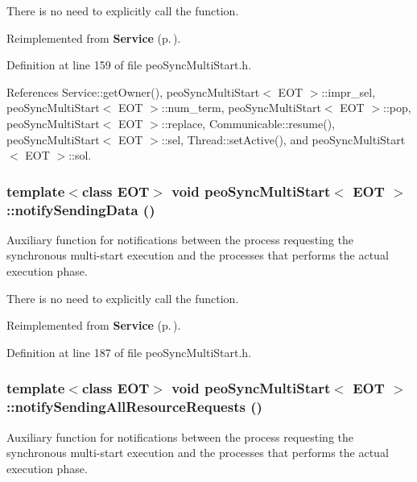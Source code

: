 There is no need to explicitly call the function. 

Reimplemented from {\bf Service} {\rm (p.\,\pageref{class_service_45c06344edbfa482b91f68e2035a6099})}.

Definition at line 159 of file peo\-Sync\-Multi\-Start.h.

References Service::get\-Owner(), peo\-Sync\-Multi\-Start$<$ EOT $>$::impr\_\-sel, peo\-Sync\-Multi\-Start$<$ EOT $>$::num\_\-term, peo\-Sync\-Multi\-Start$<$ EOT $>$::pop, peo\-Sync\-Multi\-Start$<$ EOT $>$::replace, Communicable::resume(), peo\-Sync\-Multi\-Start$<$ EOT $>$::sel, Thread::set\-Active(), and peo\-Sync\-Multi\-Start$<$ EOT $>$::sol.
\subsubsection{\setlength{\rightskip}{0pt plus 5cm}template$<$class EOT$>$ void {\bf peo\-Sync\-Multi\-Start}$<$ EOT $>$::notify\-Sending\-Data ()\hspace{0.3cm}{\tt  [virtual]}}\label{classpeo_sync_multi_start_32ec0d01d3fd8a9932abd68f4781fc94}


Auxiliary function for notifications between the process requesting the synchronous multi-start execution and the processes that performs the actual execution phase. 

There is no need to explicitly call the function. 

Reimplemented from {\bf Service} {\rm (p.\,\pageref{class_service_81ad4d6ebb50045b8977e2ab74826f30})}.

Definition at line 187 of file peo\-Sync\-Multi\-Start.h.
\subsubsection{\setlength{\rightskip}{0pt plus 5cm}template$<$class EOT$>$ void {\bf peo\-Sync\-Multi\-Start}$<$ EOT $>$::notify\-Sending\-All\-Resource\-Requests ()\hspace{0.3cm}{\tt  [virtual]}}\label{classpeo_sync_multi_start_fc90282cc4e93cdea8f82fd52dd78fb0}


Auxiliary function for notifications between the process requesting the synchronous multi-start execution and the processes that performs the actual execution phase. 

